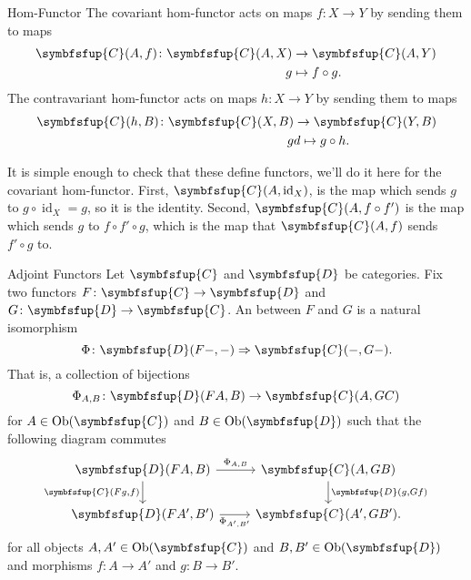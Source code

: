 \documentclass[fleqn]{NotesClass}
\newcommand{\cat}[1]{\symbfsfup{#1}}
\DeclareMathOperator{\Ob}{Ob}
\DeclareMathOperator{\id}{id}
\newcommand{\naturalTransformation}{\Rightarrow}
\begin{document}
\begin{appendices}
\begin{dfn}{Hom-Functor}{}
            The covariant hom-functor acts on maps \(f \colon X \to Y\) by sending them to maps
            \begin{align}
                \cat{C}(A, f) \colon \cat{C}(A, X) &\to \cat{C}(A, Y)\\
                g &\mapsto f\circ g.
            \end{align}
            The contravariant hom-functor acts on maps \(h \colon X \to Y\) by sending them to maps
            \begin{align}
                \cat{C}(h, B) \colon \cat{C}(X, B) &\to \cat{C}(Y, B)\\
                g &d\mapsto g \circ h.
            \end{align}
        \end{dfn}
        
        It is simple enough to check that these define functors, we'll do it here for the covariant hom-functor.
        First, \(\cat{C}(A, \id_X)\), is the map which sends \(g\) to \(g \circ \id_X = g\), so it is the identity.
        Second, \(\cat{C}(A, f \circ f')\) is the map which sends \(g\) to \(f \circ f' \circ g\), which is the map that \(\cat{C}(A, f)\) sends \(f' \circ g\) to.
        
        \begin{dfn}{Adjoint Functors}{}
            Let \(\cat{C}\) and \(\cat{D}\) be categories.
            Fix two functors \(F \colon \cat{C} \to \cat{D}\) and \(G \colon \cat{D} \to \cat{C}\).
            An  between \(F\) and \(G\) is a natural isomorphism
            \begin{equation}
                \Phi \colon \cat{D}(F-, -) \naturalTransformation \cat{C}(-, G-).
            \end{equation}
            That is, a collection of bijections
            \begin{equation}
                \Phi_{A,B} \colon \cat{D}(FA, B) \to \cat{C}(A, GC)
            \end{equation}
            for \(A \in \Ob(\cat{C})\) and \(B \in \Ob(\cat{D})\) such that the following diagram commutes
            \begin{equation}
                \begin{tikzcd}
                    \cat{D}(FA, B) \arrow[r, "\Phi_{A,B}"] \arrow[d, "{\cat{C}(Fg, f)}"'] & \cat{C}(A, GB) \arrow[d, "{\cat{D}(g, Gf)}"]\\
                    \cat{D}(FA', B') \arrow[r, "\Phi_{A',B'}"'] & \cat{C}(A', GB').
                \end{tikzcd}
            \end{equation}
            for all objects \(A, A' \in \Ob(\cat{C})\) and \(B, B' \in \Ob(\cat{D})\) and morphisms \(f \colon A \to A'\) and \(g \colon B \to B'\).
            

\end{dfn}
\end{appendices}
\end{document}
